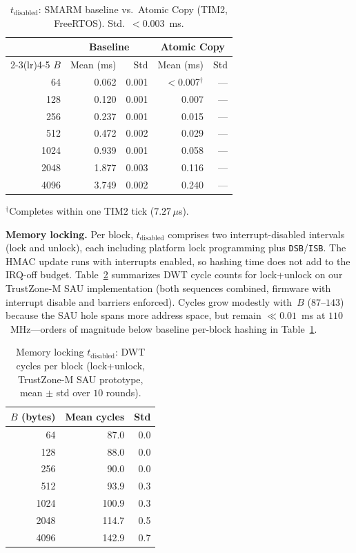 \documentclass[conference]{IEEEtran}
\newcommand{\tdis}{$t_{\mathrm{disabled}}$\xspace}
\begin{document}
\begin{table}[!t]
  \centering
  \small
  \caption{$t_{\mathrm{disabled}}$: SMARM baseline vs.\ Atomic Copy
    (TIM2, FreeRTOS). Std.\ $<0.003$~ms.}
  \label{tab:tdisabled}
  \setlength{\tabcolsep}{3.5pt}
  \begin{tabular}{rrrrr}
    \toprule
    & \multicolumn{2}{c}{\textbf{Baseline}}
    & \multicolumn{2}{c}{\textbf{Atomic Copy}} \\
    \cmidrule(lr){2-3}\cmidrule(lr){4-5}
    \textbf{$B$} & Mean (ms) & Std & Mean (ms) & Std \\
    \midrule
    64   & 0.062 & 0.001 & $<$0.007$^\dagger$ & --- \\
    128  & 0.120 & 0.001 & 0.007 & --- \\
    256  & 0.237 & 0.001 & 0.015 & --- \\
    512  & 0.472 & 0.002 & 0.029 & --- \\
    1024 & 0.939 & 0.001 & 0.058 & --- \\
    2048 & 1.877 & 0.003 & 0.116 & --- \\
    4096 & 3.749 & 0.002 & 0.240 & --- \\
    \bottomrule
  \end{tabular}

  \smallskip
  \raggedright\footnotesize
  $^\dagger$Completes within one TIM2 tick ($7.27\,\mu$s).
\end{table}

\textbf{Memory locking.} Per block, \tdis comprises two
interrupt-disabled intervals (lock and unlock), each including platform
lock programming plus \texttt{DSB}/\texttt{ISB}. The HMAC update runs
with interrupts enabled, so hashing time does not add to the IRQ-off
budget. Table~\ref{tab:tdis_lock} summarizes DWT cycle counts for
lock+unlock on our TrustZone-M SAU implementation (both sequences
combined, firmware with interrupt disable and barriers enforced). Cycles
grow modestly with~$B$ ($87$--$143$) because the SAU hole spans more
address space, but remain $\ll 0.01$~ms at $110$~MHz---orders of
magnitude below baseline per-block hashing in Table~\ref{tab:tdisabled}.

\begin{table}[!t]
  \centering
  \small
  \caption{Memory locking \tdis: DWT cycles per block (lock+unlock,
    TrustZone-M SAU prototype, mean $\pm$ std over $10$ rounds).}
  \label{tab:tdis_lock}
  \setlength{\tabcolsep}{4pt}
  \begin{tabular}{rrr}
    \toprule
    \textbf{$B$ (bytes)} & \textbf{Mean cycles} & \textbf{Std} \\
    \midrule
    64   & 87.0 & 0.0 \\
    128  & 88.0 & 0.0 \\
    256  & 90.0 & 0.0 \\
    512  & 93.9 & 0.3 \\
    1024 & 100.9 & 0.3 \\
    2048 & 114.7 & 0.5 \\
    4096 & 142.9 & 0.7 \\
    \bottomrule
  \end{tabular}
\end{table}
\end{document}
